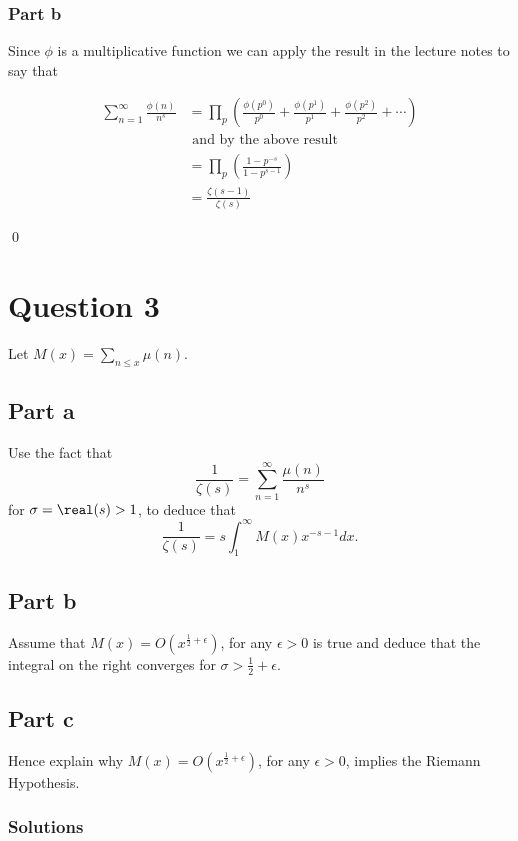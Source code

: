 \documentclass{unswmaths}
\begin{document}
\subsubsection*{Part b}

Since $ \phi $ is a multiplicative function we can apply the result in the lecture notes to say that

\begin{align*}
	\sum_{n=1}^\infty \frac{\phi(n)}{n^s} &= \prod_p \left( \frac{\phi(p^0)}{p^0} + \frac{\phi(p^1)}{p^1} + \frac{\phi(p^2)}{p^2} + \cdots  \right) \\
	& \text{ and by the above result } \\
	&= \prod_p \left( \frac{1-p^{-s}}{1-p^{s-1}} \right) \\
	&= \frac{\zeta(s-1)}{\zeta(s)}
\end{align*}

\qed

\section*{Question 3}

Let $ M(x) = \sum_{n \leq x} \mu(n) $.

\subsection*{Part a}

Use the fact that 
$$
	\frac{1}{\zeta(s)} = \sum_{n =1}^\infty \frac{\mu(n)}{n^s}
$$
for $ \sigma = \real(s) > 1 $, to deduce that 
$$
	\frac{1}{\zeta(s)} = s \int_1^\infty M(x)x^{-s-1} dx.
$$

\subsection*{Part b}
Assume that $ M(x) = O(x^{\frac{1}{2} + \epsilon}) $, for any $ \epsilon > 0 $ is true and deduce 
that the integral on the right converges for $ \sigma > \frac{1}{2} + \epsilon $.

\subsection*{Part c}

Hence explain why $ M(x) = O(x^{\frac{1}{2} + \epsilon}) $, for any $ \epsilon > 0 $, implies the Riemann Hypothesis.

\subsubsection*{Solutions}
\end{document}
